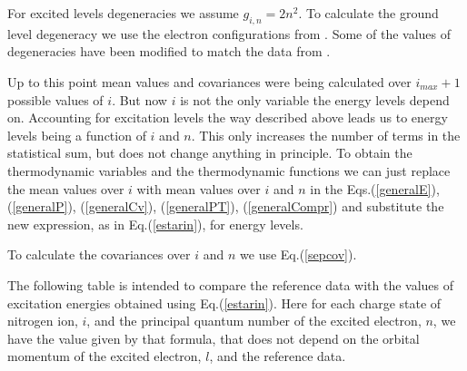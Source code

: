 For excited levels degeneracies we assume $g_{i,n} = 2 n^2$. To calculate the
ground level degeneracy we use the electron configurations from \cite{Carlson}.
Some of the values of degeneracies have been modified to match the data from \cite{allenAQ}.

Up to this point mean values and covariances were being calculated over $i_{max}+1$ possible
values of $i$. But now $i$ is not the only variable the energy levels depend on.
Accounting for excitation levels the way described above leads us to energy levels
being a function of $i$ and $n$.
This only increases the number of terms in the statistical sum, but does not change
anything in principle. To obtain the thermodynamic variables and the thermodynamic functions
we can just replace the mean values over $i$ with mean values over $i$ and $n$ in the
Eqs.(\ref{generalE}), (\ref{generalP}), (\ref{generalCv}),
(\ref{generalPT}), (\ref{generalCompr}) and substitute the new expression, as in Eq.(\ref{estarin}), 
for energy levels.

To calculate the covariances over $i$ and $n$ we use Eq.(\ref{sepcov}).

The following table is intended to compare the reference data with
the values of excitation energies obtained using Eq.(\ref{estarin}). Here for each
charge state of nitrogen ion, $i$, and the principal quantum number of the excited
electron, $n$, we have the value given by that formula, that does not depend on the
orbital momentum of the excited electron, $l$, and the reference data.


